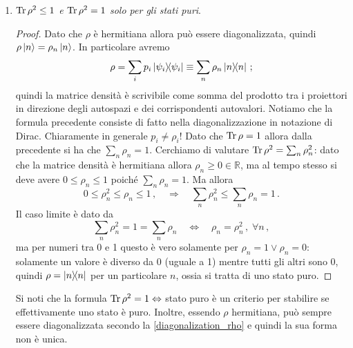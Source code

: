\begin{enumerate}
    \item \textit{$\Tr \rho^2 \leq 1$ e $\Tr \rho^2 = 1$ solo per gli stati puri}.
    \begin{proof}
        Dato che $\rho$ è hermitiana allora può essere diagonalizzata, quindi $\rho \ket{n} = \rho_n \ket{n}$. In particolare avremo
        \begin{equation}\label{diagonalization_rho}
            \rho = \sum_i p_i \ketbra{\psi_i} \equiv \sum_n \rho_n \ketbra{n} \, ;
        \end{equation}
        quindi la matrice densità è scrivibile come somma del prodotto tra i proiettori in direzione degli autospazi e dei corrispondenti autovalori. Notiamo che la formula precedente consiste di fatto nella diagonalizzazione in notazione di Dirac. Chiaramente in generale $p_i \neq \rho_i$! Dato che $\Tr \rho = 1$ allora dalla precedente si ha che $\sum_n \rho_n = 1$. Cerchiamo di valutare $\Tr \rho^2 = \sum_n \rho_n^2$: dato che la matrice densità è hermitiana allora $\rho_n \geq 0 \in \mathbb{R}$, ma al tempo stesso si deve avere $0 \leq \rho_n \leq 1$ poiché $\sum_n \rho_n = 1$. Ma allora
        \begin{equation*}
            0 \leq \rho_n^2 \leq \rho_n \leq 1 \, , \quad \Rightarrow \quad \sum_n \rho_n^2 \leq \sum_n \rho_n = 1 \, .
        \end{equation*}
        Il caso limite è dato da
        \begin{equation*}
            \sum_n \rho_n^2 = 1 = \sum_n \rho_n \quad \Leftrightarrow \quad \rho_n = \rho_n^2 \, , \; \forall n \, ,
        \end{equation*}
        ma per numeri tra 0 e 1 questo è vero solamente per $\rho_n = 1 \lor \rho_n = 0$: solamente un valore è diverso da 0 (uguale a 1) mentre tutti gli altri sono 0, quindi $\rho = \ketbra{n}$ per un particolare $n$, ossia si tratta di uno stato puro. 
    \end{proof}
    Si noti che la formula $\Tr \rho^2 = 1 \Leftrightarrow $ stato puro è un criterio per stabilire se effettivamente uno stato è puro. Inoltre, essendo $\rho$ hermitiana, può sempre essere diagonalizzata secondo la \eqref{diagonalization_rho} e quindi la sua forma non è unica.
\end{enumerate}


